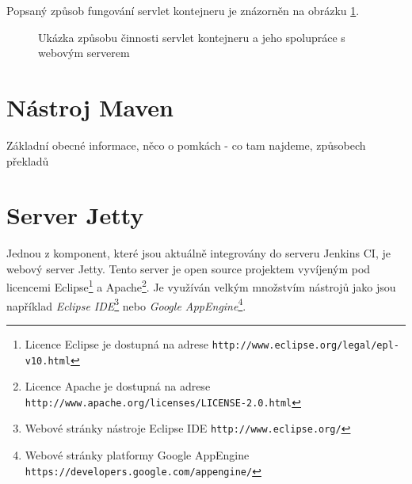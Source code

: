             Popsaný způsob fungování servlet kontejneru je znázorněn na obrázku \ref{imgServlet}.
            \begin{figure}[ht]
                \begin{center}
                    \caption{Ukázka způsobu činnosti servlet kontejneru a jeho spolupráce s webovým serverem \cite{webserverVsServletPage}}
                    \label{imgServlet}
                \end{center}
            \end{figure}


         
    \section{Nástroj Maven} \label{maven}
        Základní obecné informace, něco o pomkách - co tam najdeme, způsobech překladů
        \cite{mavenWeb}

    \section{Server Jetty} \label{jetty}
        Jednou z komponent, které jsou aktuálně integrovány do serveru Jenkins CI, je webový server Jetty.
        Tento server je open source projektem vyvíjeným pod licencemi 
        Eclipse\footnote{Licence Eclipse je dostupná na adrese \texttt{http://www.eclipse.org/legal/epl-v10.html}} a
        Apache\footnote{Licence Apache je dostupná 
        na adrese \texttt{http://www.apache.org/licenses/LICENSE-2.0.html}}. 
        Je využíván velkým množstvím nástrojů jako jsou například \emph{Eclipse IDE}\footnote{Webové stránky nástroje Eclipse IDE 
        \texttt{http://www.eclipse.org/}} nebo \emph{Google AppEngine}\footnote{Webové stránky platformy Google AppEngine
        \texttt{https://developers.google.com/appengine/}}.

